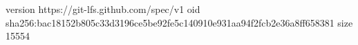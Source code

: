 version https://git-lfs.github.com/spec/v1
oid sha256:bac18152b805c33d3196ce5be92fe5c140910e931aa94f2fcb2e36a8ff658381
size 15554
